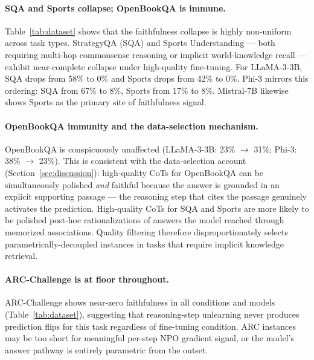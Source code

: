 \documentclass[11pt]{article}
\begin{document}
\paragraph{SQA and Sports collapse; OpenBookQA is immune.}
Table~\ref{tab:dataset} shows that the faithfulness collapse is
highly non-uniform across task types. StrategyQA (SQA) and Sports
Understanding --- both requiring multi-hop commonsense reasoning or
implicit world-knowledge recall --- exhibit near-complete collapse
under high-quality fine-tuning.  For LLaMA-3-3B, SQA drops from
58\% to 0\% and Sports drops from 42\% to 0\%. Phi-3 mirrors this
ordering: SQA from 67\% to 8\%, Sports from 17\% to 8\%. Mistral-7B
likewise shows Sports as the primary site of faithfulness signal.

\paragraph{OpenBookQA immunity and the data-selection mechanism.}
OpenBookQA is conspicuously unaffected (LLaMA-3-3B: 23\%
$\to$ 31\%; Phi-3: 38\% $\to$ 23\%). This is consistent with the
data-selection account (Section~\ref{sec:discussion}): high-quality
CoTs for OpenBookQA can be simultaneously polished \textit{and}
faithful because the answer is grounded in an explicit supporting
passage --- the reasoning step that cites the passage genuinely
activates the prediction. High-quality CoTs for SQA and Sports are
more likely to be polished post-hoc rationalizations of answers the
model reached through memorized associations. Quality filtering
therefore disproportionately selects parametrically-decoupled
instances in tasks that require implicit knowledge retrieval.

\paragraph{ARC-Challenge is at floor throughout.}
ARC-Challenge shows near-zero faithfulness in all conditions and
models (Table~\ref{tab:dataset}), suggesting that reasoning-step
unlearning never produces prediction flips for this task regardless
of fine-tuning condition. ARC instances may be too short for
meaningful per-step NPO gradient signal, or the model's answer
pathway is entirely parametric from the outset.
\end{document}
